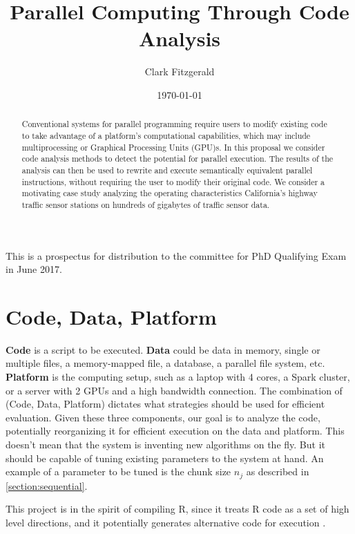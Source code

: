 \documentclass[12pt]{article}
\begin{document}
\title{Parallel Computing Through Code Analysis}
\date{\today}
\author{Clark Fitzgerald}
\maketitle

\begin{abstract}

    Conventional systems for parallel programming require users to modify
    existing code to take advantage of a platform's computational
    capabilities, which may include multiprocessing or Graphical Processing
    Units (GPU)s. In this proposal we consider code analysis methods to
    detect the potential for parallel execution. The results of the
    analysis can then be used to rewrite and execute semantically
    equivalent parallel instructions, without requiring the user to modify
    their original code.  We consider a motivating case study analyzing the
    operating characteristics California's highway traffic sensor stations
    on hundreds of gigabytes of traffic sensor data.

\end{abstract}

This is a prospectus for distribution to the committee for PhD
Qualifying Exam in June 2017.

\section{Code, Data, Platform}

\textbf{Code} is a script to be executed.
\textbf{Data} could be data in memory, single or multiple files, a
memory-mapped file, a database, a parallel file system, etc.
\textbf{Platform} is the computing setup, such as a laptop with 4 cores, a
Spark cluster, or a server with 2 GPUs and a high bandwidth connection. The combination
of (Code, Data, Platform) dictates what strategies should be used for
efficient evaluation. Given these three components, our goal is to analyze the
code, potentially reorganizing it for efficient execution on the data and
platform. This doesn't mean that the system is inventing new algorithms on
the fly. But it should be capable of tuning existing parameters to the
system at hand. An example of a parameter to be tuned is the chunk size
$n_j$ as described in \ref{section:sequential}.

This project is in the spirit of compiling R, since it treats R code as
a set of high level directions, and it potentially generates alternative
code for execution \cite{lang2014enhancing}.
\end{document}
